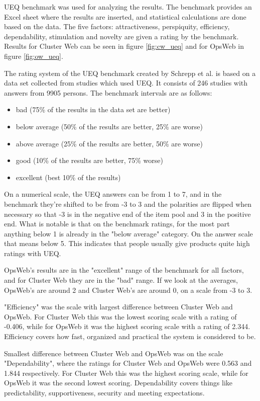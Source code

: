 UEQ benchmark was used for analyzing the results. \cite{schrepp2017construction} The benchmark provides an Excel sheet where the results are inserted, and statistical calculations are done based on the data. The five factors: attractiveness, perspiquity, efficiency, dependability, stimulation and novelty are given a rating by the benchmark. Results for Cluster Web can be seen in figure \ref{fig:cw_ueq} and for OpsWeb in figure \ref{fig:ow_ueq}.

The rating system of the UEQ benchmark created by Schrepp et al. is based on a data set collected from studies which used UEQ. It consists of 246 studies with answers from 9905 persons. The benchmark intervals are as follows:
\begin{itemize}
    \item bad (75\% of the results in the data set are better)
    \item below average (50\% of the results are better, 25\% are worse)
    \item above average (25\% of the results are better, 50\% are worse)
    \item good (10\% of the results are better, 75\% worse)
    \item excellent (best 10\% of the results)
\end{itemize}\cite{schrepp2017construction}

On a numerical scale, the UEQ answers can be from 1 to 7, and in the benchmark they're shifted to be from -3 to 3 and the polarities are flipped when necessary so that -3 is in the negative end of the item pool and 3 in the positive end. What is notable is that on the benchmark ratings, for the most part anything below 1 is already in the "below average" category. On the answer scale that means below 5. This indicates that people usually give products quite high ratings with UEQ.

OpsWeb's results are in the "excellent" range of the benchmark for all factors, and for Cluster Web they are in the "bad" range. If we look at the averages, OpsWeb's are around 2 and Cluster Web's are around 0, on a scale from -3 to 3. 

"Efficiency" was the scale with largest difference between Cluster Web and OpsWeb. For Cluster Web this was the lowest scoring scale with a rating of -0.406, while for OpsWeb it was the highest scoring scale with a rating of 2.344. Efficiency covers how fast, organized and practical the system is considered to be.

Smallest difference between Cluster Web and OpsWeb was on the scale "Dependability", where the ratings for Cluster Web and OpsWeb were 0.563 and 1.844 respectively. For Cluster Web this was the highest scoring scale, while for OpsWeb it was the second lowest scoring. Dependability covers things like predictability, supportiveness, security and meeting expectations.

